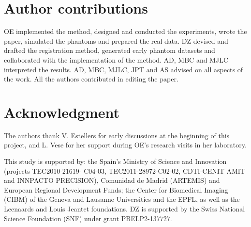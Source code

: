 \section*{Author contributions}
OE implemented the method, designed and conducted the experiments, wrote the paper,
  simulated the phantoms and prepared the real data.
DZ devised and drafted the registration method, generated early phantom datasets and
  collaborated with the implementation of the method.
AD, MBC and MJLC interpreted the results.
AD, MBC, MJLC, JPT and AS advised on all aspects of the work.
All the authors contributed in editing the paper.

\section*{Acknowledgment}
The authors thank V. Estellers for early discussions at the beginning of this project,
  and L. Vese for her support during OE's research visits in her laboratory.

This study is supported by: the Spain's Ministry of Science and Innovation
  (projects TEC2010-21619- C04-03, TEC2011-28972-C02-02, CDTI-CENIT
  AMIT and INNPACTO PRECISION), Comunidad de Madrid (ARTEMIS) and
  European Regional Development Funds; the Center for Biomedical Imaging
  (CIBM) of the Geneva and Lausanne Universities and the EPFL, as well as the
  Leenaards and Louis Jeantet foundations.
DZ is supported by the Swiss National Science Foundation (SNF) under grant PBELP2-137727.

